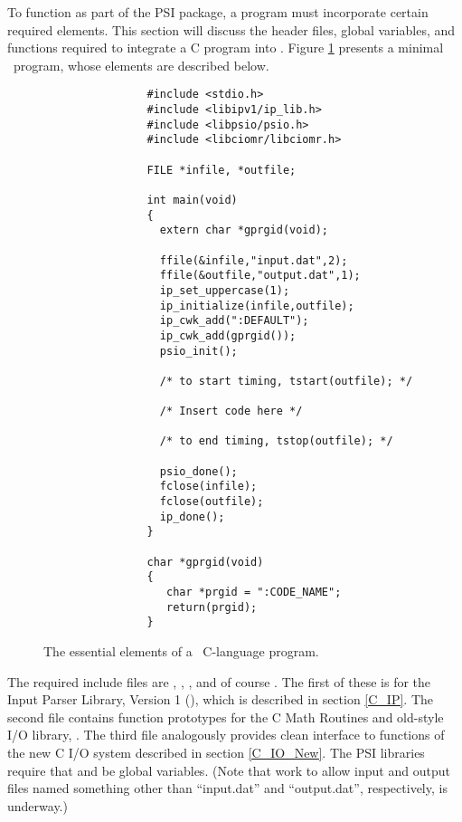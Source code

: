 %
%
%
%

To function as part of the PSI package, a program must incorporate
certain required elements.  This section will discuss the header
files, global variables, and functions required to integrate a C
program into \PSIthree.  Figure \ref{fig:Essential_C_Program} presents
a minimal \PSIthree\ program, whose elements are described below.

\begin{figure}
\begin{verbatim}
                #include <stdio.h>
                #include <libipv1/ip_lib.h>
                #include <libpsio/psio.h>
                #include <libciomr/libciomr.h>

                FILE *infile, *outfile;

                int main(void)
                {
                  extern char *gprgid(void);

                  ffile(&infile,"input.dat",2);
                  ffile(&outfile,"output.dat",1);
                  ip_set_uppercase(1);
                  ip_initialize(infile,outfile);
                  ip_cwk_add(":DEFAULT");
                  ip_cwk_add(gprgid());
                  psio_init();

                  /* to start timing, tstart(outfile); */
                
                  /* Insert code here */

                  /* to end timing, tstop(outfile); */

                  psio_done();
                  fclose(infile);
                  fclose(outfile);
                  ip_done();
                }

                char *gprgid(void)
                {
                   char *prgid = ":CODE_NAME";
                   return(prgid);
                }               
\end{verbatim}
\caption{The essential elements of a \PSIthree\ C-language program.}
\label{fig:Essential_C_Program}
\end{figure}

The required include files are ,
, , and of course
.  The first of these is for the Input Parser Library,
Version 1 (), which is described in section
\ref{C_IP}.  The second file contains function prototypes for the C
Math Routines and old-style I/O library, .  The third
file analogously provides clean interface to functions of the new C
I/O system described in section \ref{C_IO_New}.  The PSI libraries
require that  and  be global variables.
(Note that work to allow input and output files named something other
than ``input.dat'' and ``output.dat'', respectively, is underway.)

